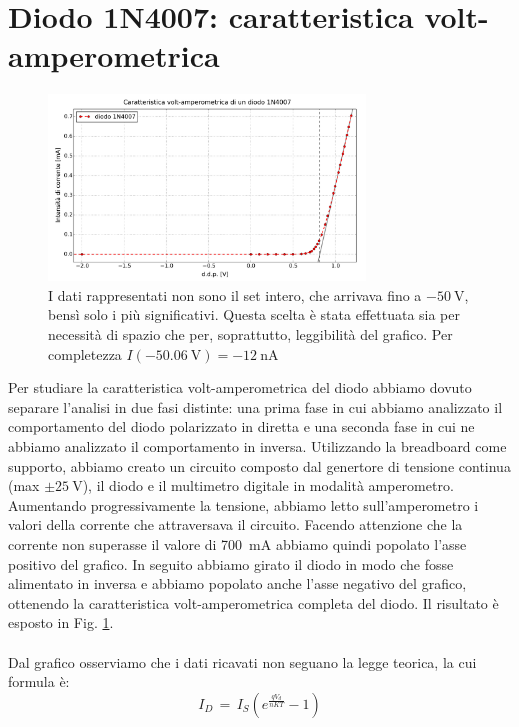 \section{Diodo 1N4007: caratteristica volt-amperometrica}

\begin{figure}
	\label{fig:diodo}
	\includegraphics[width=0.75\textwidth]{diodo.pdf}
	\caption{I dati rappresentati non sono il set intero, che arrivava fino a $\SI{-50}{\volt}$, bensì solo i più significativi. Questa scelta è stata effettuata sia per necessità di spazio che per, soprattutto, leggibilità del grafico. Per completezza $I(\SI{-50.06}{\volt}) = \SI{-12}{\nano\ampere}$}
\end{figure}

Per studiare la caratteristica volt-amperometrica del diodo abbiamo dovuto separare l'analisi in due fasi distinte: una prima fase in cui abbiamo analizzato il comportamento del diodo polarizzato in diretta e una seconda fase in cui ne abbiamo analizzato il comportamento in inversa.
Utilizzando la breadboard come supporto, abbiamo creato un circuito composto dal genertore di tensione continua (max $\pm \SI{25}{\volt}$), il diodo e il multimetro digitale in modalità amperometro. Aumentando progressivamente la tensione, abbiamo letto sull'amperometro i valori della corrente che attraversava il circuito.
Facendo attenzione che la corrente non superasse il valore di \SI{700}{\milli\ampere} abbiamo quindi popolato l'asse positivo del grafico. In seguito abbiamo girato il diodo in modo che fosse alimentato in inversa e abbiamo popolato anche l'asse negativo del grafico, ottenendo la caratteristica volt-amperometrica completa del diodo. Il risultato è esposto in Fig. \ref{fig:diodo}.
\\
\\
Dal grafico osserviamo che i dati ricavati non seguano la legge teorica, la cui formula è:
\begin{equation}
I_{D} \, = \, I_{S} \left( e^{\frac{q V_d}{nKT}} -1 \right)
\label{eq:diode}
\end{equation}

